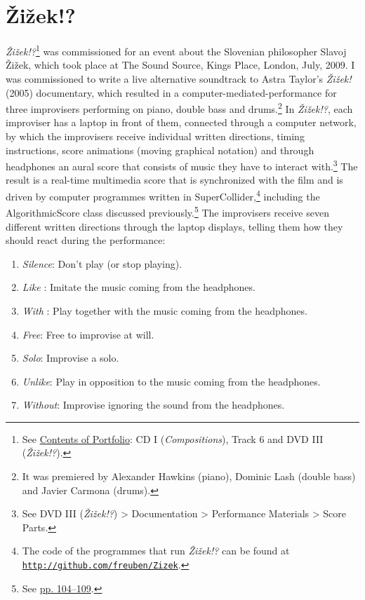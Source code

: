 \section{\v{Z}i\v{z}ek!?}

\emph{\v{Z}i\v{z}ek!?}\footnote{See \hyperlink{portfolio}{Contents of Portfolio}: CD I (\emph{Compositions}), Track 6 and DVD III (\emph{\v{Z}i\v{z}ek!?}).} was commissioned for an event about the Slovenian philosopher Slavoj \v{Z}i\v{z}ek, which took place at The Sound Source, Kings Place, London, July, 2009. I was commissioned to write a live alternative soundtrack to Astra Taylor's \emph{\v{Z}i\v{z}ek!} (2005) documentary, which resulted in a \mbox{computer-mediated-performance} for three improvisers performing on piano, double bass and drums.\footnote{It was premiered by Alexander Hawkins (piano), Dominic Lash (double bass) and Javier Carmona (drums).} In \emph{\v{Z}i\v{z}ek!?}, each improviser has a laptop in front of them, connected through a computer network, by which the improvisers receive individual written directions, timing instructions, score animations (moving graphical notation) and through headphones an aural score that consists of music they have to interact with.\footnote{See DVD III (\emph{\v{Z}i\v{z}ek!?}) \tiny \textgreater \footnotesize \hspace{0pt} Documentation \tiny \textgreater \footnotesize \hspace{0pt} Performance Materials \tiny \textgreater \footnotesize \hspace{0pt} Score Parts.} The result is a real-time multimedia score that is synchronized with the film and is driven by computer programmes written in SuperCollider,\footnote{The code of the programmes that run \emph{\v{Z}i\v{z}ek!?} can be found at \href{http://github.com/freuben/Zizek}{\texttt {http://github.com/freuben/Zizek}}.} including the AlgorithmicScore class discussed previously.\footnote{See \hyperlink{algoscore}{pp. 104--109}.} The improvisers receive seven different written directions through the laptop displays, telling them how they should react during the performance:
\begin{enumerate}
\item \emph{Silence}: Don't play (or stop playing).
\item \emph{Like} : Imitate the music coming from the headphones.
\item \emph{With} : Play together with the music coming from the headphones.
\item \emph{Free}: Free to improvise at will.
\item \emph{Solo}: Improvise a solo.
\item \emph{Unlike}: Play in opposition to the music coming from the headphones. 
\item \emph{Without}: Improvise ignoring the sound from the headphones.
\end{enumerate}
